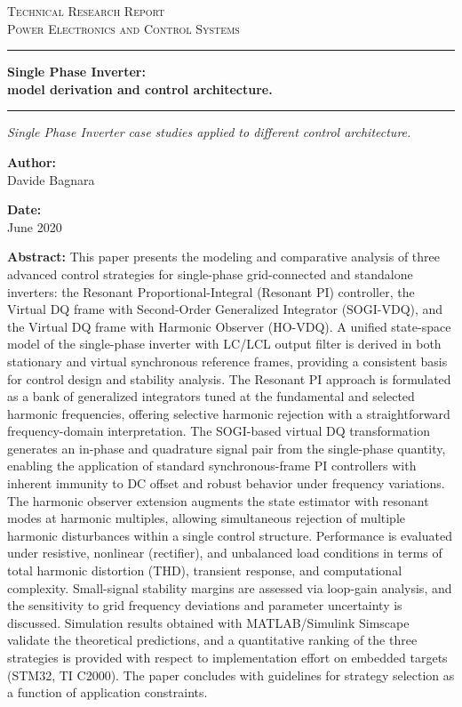 \documentclass[12pt,a4paper]{scrartcl}
\newcommand{\DocCategory}{Technical Research Report}
\newcommand{\DocField}{Power Electronics and Control Systems}
\newcommand{\DocTitle}{%
	{\fontsize{20}{24}\selectfont\bfseries Single Phase Inverter:} \\[16pt]
	{\fontsize{16}{20}\selectfont\bfseries model derivation and control architecture.}
}
\newcommand{\DocSubtitle}{%
Single Phase Inverter case studies applied to different control architecture. 
}
\newcommand{\DocAuthor}{Davide Bagnara}
\newcommand{\DocDate}{June 2020}
\newcommand{\DocAbstract}{%
This paper presents the modeling and comparative analysis of three advanced control strategies for single-phase grid-connected and standalone inverters: the Resonant Proportional-Integral (Resonant PI) controller, the Virtual DQ frame with Second-Order Generalized Integrator (SOGI-VDQ), and the Virtual DQ frame with Harmonic Observer (HO-VDQ). A unified state-space model of the single-phase inverter with LC/LCL output filter is derived in both stationary and virtual synchronous reference frames, providing a consistent basis for control design and stability analysis. The Resonant PI approach is formulated as a bank of generalized integrators tuned at the fundamental and selected harmonic frequencies, offering selective harmonic rejection with a straightforward frequency-domain interpretation. The SOGI-based virtual DQ transformation generates an in-phase and quadrature signal pair from the single-phase quantity, enabling the application of standard synchronous-frame PI controllers with inherent immunity to DC offset and robust behavior under frequency variations. The harmonic observer extension augments the state estimator with resonant modes at harmonic multiples, allowing simultaneous rejection of multiple harmonic disturbances within a single control structure. Performance is evaluated under resistive, nonlinear (rectifier), and unbalanced load conditions in terms of total harmonic distortion (THD), transient response, and computational complexity. Small-signal stability margins are assessed via loop-gain analysis, and the sensitivity to grid frequency deviations and parameter uncertainty is discussed. Simulation results obtained with MATLAB/Simulink Simscape validate the theoretical predictions, and a quantitative ranking of the three strategies is provided with respect to implementation effort on embedded targets (STM32, TI C2000). The paper concludes with guidelines for strategy selection as a function of application constraints.
}
\begin{document}
	\titlepage
	\begin{center}
		{\Large\scshape \DocCategory}\\[8pt]
		{\large\scshape \DocField}
	\end{center}
	
	\vspace{18pt}
	\noindent\rule{\linewidth}{0.8pt}
	
	\vspace{18pt}
	\begin{center}
		\DocTitle
	\end{center}
	
	\vspace{4pt}
	\noindent\rule{\linewidth}{2.2pt}
	
	\begin{center}
		\begin{onehalfspace}
			{\large\itshape \DocSubtitle}
		\end{onehalfspace}
	\end{center}
	
	
	\begin{minipage}{0.92\linewidth}
		\noindent
		\begin{minipage}[t]{0.48\linewidth}
			\textbf{Author:}\\[2pt]
			\DocAuthor
		\end{minipage}%
		\hfill
		\begin{minipage}[t]{0.48\linewidth}
			\raggedleft
			\textbf{Date:}\\[2pt]
			\DocDate
		\end{minipage}
	\end{minipage}
	\vspace{18pt}
	
	\begin{center}
		\begin{minipage}{0.85\linewidth}
			\footnotesize 
			\begin{onehalfspace}
				\textbf{Abstract:} \DocAbstract
			\end{onehalfspace}
		\end{minipage}
	\end{center}
	
\end{document}
